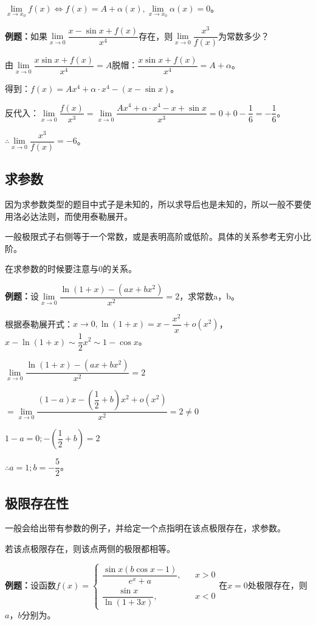 \documentclass[UTF8, 12pt]{ctexart}
\begin{document}
$\lim\limits_{x\to x_0}f(x)\Leftrightarrow f(x)=A+\alpha(x),\lim\limits_{x\to x_0}\alpha(x)=0$。

\textbf{例题：}如果$\lim\limits_{x\to 0}\dfrac{x-\sin x+f(x)}{x^4}$存在，则$\lim\limits_{x\to 0}\dfrac{x^3}{f(x)}$为常数多少？

由$\lim\limits_{x\to 0}\dfrac{x\sin x+f(x)}{x^4}=A$脱帽：$\dfrac{x\sin x+f(x)}{x^4}=A+\alpha$。

得到：$f(x)=Ax^4+\alpha\cdot x^4-(x-\sin x)$。

反代入：$\lim\limits_{x\to 0}\dfrac{f(x)}{x^3}=\lim\limits_{x\to 0}\dfrac{Ax^4+\alpha\cdot x^4-x+\sin x}{x^3}=0+0-\dfrac{1}{6}=-\dfrac{1}{6}$。

$\therefore \lim\limits_{x\to 0}\dfrac{x^3}{f(x)}=-6$。

\subsection{求参数}

因为求参数类型的题目中式子是未知的，所以求导后也是未知的，所以一般不要使用洛必达法则，而使用泰勒展开。

一般极限式子右侧等于一个常数，或是表明高阶或低阶。具体的关系参考无穷小比阶。

在求参数的时候要注意与0的关系。\medskip

\textbf{例题：}设$\lim\limits_{x\to 0}\dfrac{\ln(1+x)-(ax+bx^2)}{x^2}=2$，求常数a，b。

根据泰勒展开式：$x\to 0,\ln(1+x)=x-\dfrac{x^2}{x}+o(x^2)$，$x-\ln(1+x)\sim\dfrac{1}{2}x^2\sim 1-\cos x$。

$\lim\limits_{x\to 0}\dfrac{\ln(1+x)-(ax+bx^2)}{x^2}=2$

$=\lim\limits_{x\to 0}\dfrac{(1-a)x-\left(\dfrac{1}{2}+b\right)x^2+o(x^2)}{x^2}=2\neq 0$

$1-a=0;-\left(\dfrac{1}{2}+b\right)=2$\medskip

$\therefore a=1;b=-\dfrac{5}{2}$。

\subsection{极限存在性}

一般会给出带有参数的例子，并给定一个点指明在该点极限存在，求参数。

若该点极限存在，则该点两侧的极限都相等。\medskip

\textbf{例题：}设函数$f(x)=\left\{\begin{array}{lcl}
    \dfrac{\sin x(b\cos x-1)}{e^x+a}, & & x>0 \\
    \dfrac{\sin x}{\ln(1+3x)}, & & x<0
\end{array}
\right.$在$x=0$处极限存在，则$a$，$b$分别为。
\end{document}
